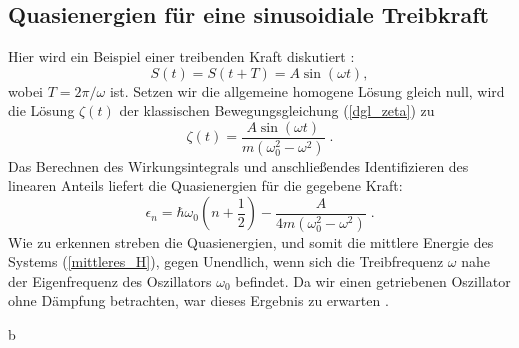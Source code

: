     \subsection{Quasienergien für eine sinusoidiale Treibkraft}
      Hier wird ein Beispiel einer treibenden Kraft diskutiert \cite{haenggi}:
      \begin{equation}
        S(t) = S(t+T) = A\sin(\omega t),
      \end{equation}
      wobei $T=2\pi / \omega$ ist.
      Setzen wir die allgemeine homogene Lösung gleich null, wird die Lösung $\zeta(t)$ der klassischen Bewegungsgleichung (\ref{dgl_zeta}) zu \cite{mads}
      \begin{equation}
        \zeta(t) = \frac{A\sin(\omega t)}{m(\omega_0^2 - \omega^2)} \; .
      \end{equation}
      Das Berechnen des Wirkungsintegrals und anschließendes Identifizieren des linearen Anteils liefert die Quasienergien für die gegebene Kraft:
      \begin{equation}
        \epsilon_n  = \hbar \omega_0\left(n+\frac{1}{2}\right) - \frac{A}{4m(\omega_0^2-\omega^2)} \;.
      \end{equation}
      Wie zu erkennen streben die Quasienergien, und somit die mittlere Energie des Systems (\ref{mittleres_H}), gegen Unendlich, wenn sich die Treibfrequenz $\omega$ nahe der Eigenfrequenz des Oszillators $\omega_0 $ befindet.
      Da wir einen getriebenen Oszillator ohne Dämpfung betrachten, war dieses Ergebnis zu erwarten \cite{mads}.



























  b
